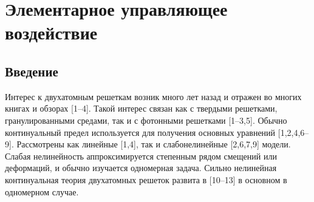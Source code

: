 \chapter{Элементарное управляющее воздействие}\label{ch:ch1}

\section{Введение}


Интерес к двухатомным решеткам возник много лет назад и отражен во многих книгах и обзорах [1–4]. Такой интерес связан как с твердыми решетками, гранулированными средами, так и с фотонными решетками [1–3,5]. Обычно континуальный предел используется для получения основных уравнений [1,2,4,6–9]. Рассмотрены как линейные [1,4], так и слабонелинейные [2,6,7,9] модели. Слабая нелинейность аппроксимируется степенным рядом смещений или деформаций, и обычно изучается одномерная задача. Сильно нелинейная континуальная теория двухатомных решеток развита в [10–13] в основном в одномерном случае.

